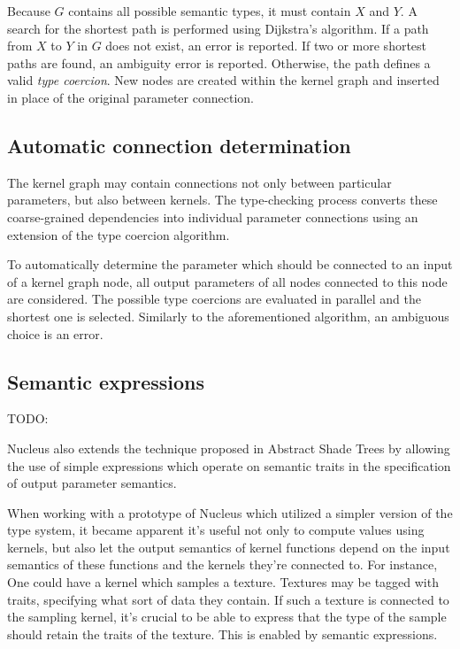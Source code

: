 Because $G$ contains all possible semantic types, it must contain $X$ and $Y$. A search for the shortest path is performed using Dijkstra's algorithm. If a path from $X$ to $Y$ in $G$ does not exist, an error is reported. If two or more shortest paths are found, an ambiguity error is reported. Otherwise, the path defines a valid \emph{type coercion}. New nodes are created within the kernel graph and inserted in place of the original parameter connection.

	
\subsection{Automatic connection determination}

The kernel graph may contain connections not only between particular parameters, but also between kernels. The type-checking process converts these coarse-grained dependencies into individual parameter connections using an extension of the type coercion algorithm.

To automatically determine the parameter which should be connected to an input of a kernel graph node, all output parameters of all nodes connected to this node are considered. The possible type coercions are evaluated in parallel and the shortest one is selected. Similarly to the aforementioned algorithm, an ambiguous choice is an error.


\subsection{Semantic expressions}

TODO:

Nucleus also extends the technique proposed in Abstract Shade Trees by allowing the use of simple expressions which operate on semantic traits in the specification of output parameter semantics.

When working with a prototype of Nucleus which utilized a simpler version of the type system, it became apparent it's useful not only to compute values using kernels, but also let the output semantics of kernel functions depend on the input semantics of these functions and the kernels they're connected to. For instance, One could have a kernel which samples a texture. Textures may be tagged with traits, specifying what sort of data they contain. If such a texture is connected to the sampling kernel, it's crucial to be able to express that the type of the sample should retain the traits of the texture. This is enabled by semantic expressions.

